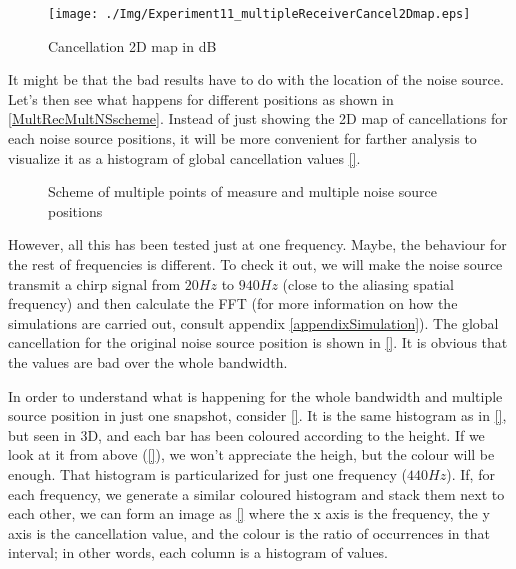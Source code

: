\begin{figure}
	\centering			\texttt{[image: ./Img/Experiment11\_multipleReceiverCancel2Dmap.eps]}
	\caption[Cancellation 2D map]{Cancellation 2D map in dB}
	\label{MultipleReceiverOneNSCanc}
\end{figure}

It might be that the bad results have to do with the location of the noise source. Let's then see what happens for different positions as shown in \autoref{MultRecMultNSscheme}. Instead of just showing the 2D map of cancellations for each noise source positions, it will be more convenient for farther analysis to visualize it as a histogram of global cancellation values
\autoref{}.

\begin{figure}
	\centering
	\caption[Scheme of multiple points of measure and multiple noise source positions]{Scheme of multiple points of measure and multiple noise source positions}
	\label{MultRecMultNSscheme}
\end{figure}

However, all this has been tested just at one frequency. Maybe, the behaviour for the rest of frequencies is different. To check it out, we will make the noise source transmit a chirp signal from $20 \si{Hz}$ to $940 \si{Hz}$ (close to the aliasing spatial frequency) and then calculate the FFT (for more information on how the simulations are carried out, consult appendix \autoref{appendixSimulation}). The global cancellation for the original noise source position is shown in \autoref{}. It is obvious that the values are bad over the whole bandwidth.

In order to understand what is happening for the whole bandwidth and multiple source position in just one snapshot, consider \autoref{}. It is the same histogram as in \autoref{}, but seen in 3D, and each bar has been coloured according to the height. If we look at it from above (\autoref{}), we won't appreciate the heigh, but the colour will be enough. That histogram is particularized for just one frequency ($440\si{Hz}$). If, for each frequency, we generate a similar coloured histogram and stack them next to each other, we can form an image as \autoref{} where the x axis is the frequency, the y axis is the cancellation value, and the colour is the ratio of occurrences in that interval; in other words, each column is a histogram of values.

